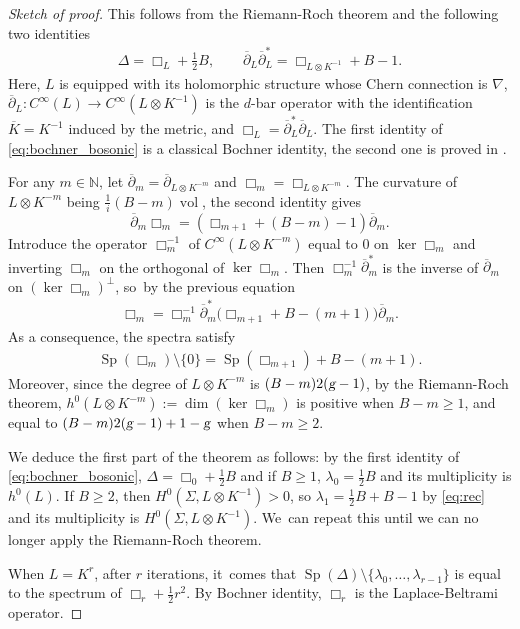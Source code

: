 \documentclass[JEP,XML,SOM,Unicode,published]{cedram}
\theoremstyle{plain}
\theoremstyle{definition}
\let\con\overline
\let\op\operatorname
\newcommand{\N}{\mathbb{N}}
\let\la\lambda
\begin{document}
\begin{proof}[Sketch of proof] This follows from the Riemann-Roch theorem and the
following two identities
\begin{gather} \label{eq:bochner_bosonic}
\Delta = \Box_L + \tfrac{1}{2} B, \qquad \con{\partial}_L
\con{\partial}_L^* = \Box_{L \otimes K^{-1}} +B -1.
\end{gather}
Here, $L$ is equipped with its holomorphic structure whose Chern connection
is $\nabla$, $\con{\partial}_L: C^{\infty} (L)
\rightarrow C^{\infty} (L \otimes K^{-1})$ is the $d$-bar
operator with the identification $\con{ K} = K^{-1}$ induced by
the metric, and $\Box_L = \con{\partial}_L^*
\con{\partial}_L$. The first identity of \eqref{eq:bochner_bosonic} is a
classical Bochner identity, the second one is proved in \cite[Th.\,7.1]{Landau1}.

For any $m \in \N$, let $\con{\partial}_m = \con{\partial}_{L \otimes
K^{-m}}$ and $\Box_m = \Box_{L \otimes K^{-m}}$. The curvature of $L
\otimes K^{-m}$ being $\frac{1}{i} (B -m) \op{vol}$, the second identity
gives
\[
\con{\partial}_m \Box_m = (
\Box_{m+1} + (B - m) - 1) \con{\partial}_m.\]
Introduce the operator $\Box_{m}^{-1}$
of $C^\infty(L \otimes K^{-m})$ equal to $0$ on $\ker \Box_m$
and inverting $\Box_m$ on the orthogonal of $\ker \Box_m$. Then
$\Box_m^{-1} \con{\partial}_m^*$ is the inverse of $\con{\partial}_m$ on
$(\ker \Box_m)^{\perp}$, so~by the previous equation
\begin{gather*}
\Box_m = \Box_m^{-1} \con{\partial}_m^* \bigl(\Box_{m+1} + B - (m+1)
\bigr) \con{\partial}_m.
\end{gather*}
As a consequence, the spectra satisfy
\begin{gather} \label{eq:rec}
\op{Sp} (\Box_m) \setminus \{ 0 \} = \op{Sp} (
\Box_{m+1}) + B - (m +1).
\end{gather}
Moreover, since the degree of $L \otimes K^{-m}$ is $(B- m) 2 (\textsl{g} -1)$, by
the Riemann-Roch theorem, $h^0 (L \otimes K^{-m}) := \op{dim} (\ker \Box_m)$ is
positive when $B - m \geqslant 1$, and equal to $(B-m) 2 (\textsl{g}-1) + 1 - \textsl{g}$ when
$B- m \geqslant 2 $.

We deduce the first part of the theorem as follows: by the first identity of
\eqref{eq:bochner_bosonic}, $\Delta = \Box_0 + \frac{1}{2} B$ and if $B
\geqslant 1$, $\la_0 = \tfrac{1}{2} B$ and its multiplicity is $h^0 (
L)$. If $B\geqslant 2$, then $H^{0} (\Sigma, L \otimes K^{-1}) >0$, so
$\la_1 =\frac{1}{2}B + B -1$ by \eqref{eq:rec} and its multiplicity is $H^{0}
(\Sigma, L \otimes K^{-1})$. We~can repeat this until we can no longer apply the Riemann-Roch theorem.

When $L = K^r$, after $r$ iterations, it~comes that $\op{Sp}(\Delta) \setminus \{ \la_0, \ldots, \la_{r-1} \}$
is equal to the spectrum of $\Box_r + \frac{1}{2} r^2$. By Bochner identity,
$\Box_r$ is the Laplace-Beltrami operator.
\end{proof}
\end{document}
